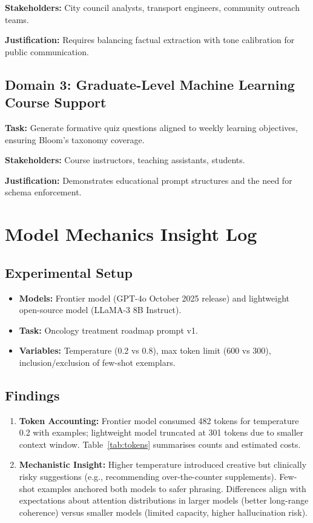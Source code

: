 \documentclass[11pt]{article}
\begin{document}
\textbf{Stakeholders:} City council analysts, transport engineers, community outreach teams.

\textbf{Justification:} Requires balancing factual extraction with tone calibration for public communication.

\subsection{Domain 3: Graduate-Level Machine Learning Course Support}
\textbf{Task:} Generate formative quiz questions aligned to weekly learning objectives, ensuring Bloom's taxonomy coverage.

\textbf{Stakeholders:} Course instructors, teaching assistants, students.

\textbf{Justification:} Demonstrates educational prompt structures and the need for schema enforcement.

\section{Model Mechanics Insight Log}
\subsection{Experimental Setup}
\begin{itemize}[leftmargin=*]
    \item \textbf{Models:} Frontier model (GPT-4o October 2025 release) and lightweight open-source model (LLaMA-3 8B Instruct).
    \item \textbf{Task:} Oncology treatment roadmap prompt v1.
    \item \textbf{Variables:} Temperature (0.2 vs 0.8), max token limit (600 vs 300), inclusion/exclusion of few-shot exemplars.
\end{itemize}

\subsection{Findings}
\begin{enumerate}[label=2.\arabic*]
    \item \textbf{Token Accounting:} Frontier model consumed 482 tokens for temperature 0.2 with examples; lightweight model truncated at 301 tokens due to smaller context window. Table~\ref{tab:tokens} summarises counts and estimated costs.
    \item \textbf{Mechanistic Insight:} Higher temperature introduced creative but clinically risky suggestions (e.g., recommending over-the-counter supplements). Few-shot examples anchored both models to safer phrasing. Differences align with expectations about attention distributions in larger models (better long-range coherence) versus smaller models (limited capacity, higher hallucination risk).
\end{enumerate}
\end{document}
